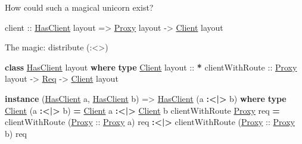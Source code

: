 \documentclass[ignorenonframetext,]{beamer}
\newenvironment{Shaded}{}{}
\newcommand{\KeywordTok}[1]{\textcolor[rgb]{0.26,0.66,0.93}{\textbf{{#1}}}}
\newcommand{\DataTypeTok}[1]{\underline{{#1}}}
\newcommand{\OtherTok}[1]{{#1}}
\newcommand{\FunctionTok}[1]{\textcolor[rgb]{1.00,0.58,0.35}{\textbf{{#1}}}}
\newcommand{\NormalTok}[1]{{#1}}
\begin{document}
\begin{frame}[fragile]{How could such a magical unicorn exist?}

\begin{Shaded}
\begin{Highlighting}[]
\NormalTok{client}
\OtherTok{  ::} \DataTypeTok{HasClient} \NormalTok{layout }\OtherTok{=>} \DataTypeTok{Proxy} \NormalTok{layout }\OtherTok{->} \DataTypeTok{Client} \NormalTok{layout                     }
\end{Highlighting}
\end{Shaded}

\end{frame}

\begin{frame}[fragile]{The magic: distribute
(:\textless{}\textbar{}\textgreater{})}

\begin{Shaded}
\begin{Highlighting}[]
\KeywordTok{class} \DataTypeTok{HasClient} \NormalTok{layout }\KeywordTok{where}
  \KeywordTok{type} \DataTypeTok{Client}\OtherTok{ layout ::} \FunctionTok{*}
  \NormalTok{clientWithRoute}
\OtherTok{    ::} \DataTypeTok{Proxy} \NormalTok{layout }\OtherTok{->} \DataTypeTok{Req} \OtherTok{->} \DataTypeTok{Client} \NormalTok{layout}


  \KeywordTok{instance} \NormalTok{(}\DataTypeTok{HasClient} \NormalTok{a, }\DataTypeTok{HasClient} \NormalTok{b)}
        \OtherTok{=>} \DataTypeTok{HasClient} \NormalTok{(a }\FunctionTok{:<|>} \NormalTok{b) }\KeywordTok{where}               
    \KeywordTok{type} \DataTypeTok{Client} \NormalTok{(a }\FunctionTok{:<|>} \NormalTok{b) }\FunctionTok{=} \DataTypeTok{Client} \NormalTok{a }\FunctionTok{:<|>} \DataTypeTok{Client} \NormalTok{b                               }
    \NormalTok{clientWithRoute }\DataTypeTok{Proxy} \NormalTok{req }\FunctionTok{=}                                                   
      \NormalTok{clientWithRoute (}\DataTypeTok{Proxy}\OtherTok{ ::} \DataTypeTok{Proxy} \NormalTok{a) req }\FunctionTok{:<|>}                                 
      \NormalTok{clientWithRoute (}\DataTypeTok{Proxy}\OtherTok{ ::} \DataTypeTok{Proxy} \NormalTok{b) req   }
\end{Highlighting}
\end{Shaded}

\end{frame}
\end{document}
